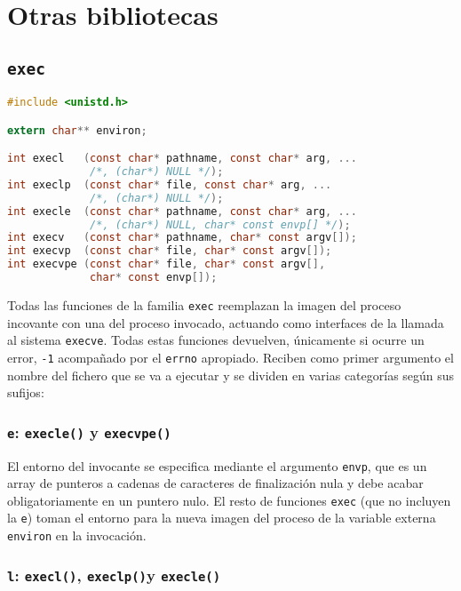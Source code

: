 \chapter{Otras bibliotecas}

\section{\texttt{exec}}\label{exec}

\begin{lstlisting}[language=C]
#include <unistd.h>

extern char** environ;

int execl   (const char* pathname, const char* arg, ...
             /*, (char*) NULL */);
int execlp  (const char* file, const char* arg, ...
             /*, (char*) NULL */);
int execle  (const char* pathname, const char* arg, ...
             /*, (char*) NULL, char* const envp[] */);
int execv   (const char* pathname, char* const argv[]);
int execvp  (const char* file, char* const argv[]);
int execvpe (const char* file, char* const argv[],
             char* const envp[]);
\end{lstlisting}

Todas las funciones de la familia \texttt{exec} reemplazan la imagen del proceso incovante con una del proceso invocado, actuando como interfaces de la llamada al sistema \texttt{execve}.
Todas estas funciones devuelven, únicamente si ocurre un error, \texttt{-1} acompañado por el \texttt{errno} apropiado.
Reciben como primer argumento el nombre del fichero que se va a ejecutar y se dividen en varias categorías según sus sufijos:

\subsection{\texttt{e}: \texttt{execle()} y \texttt{execvpe()}}

El entorno del invocante se especifica mediante el argumento \texttt{envp}, que es un array de punteros a cadenas de caracteres de finalización nula y debe acabar obligatoriamente en un puntero nulo.
El resto de funciones \texttt{exec} (que no incluyen la \texttt{e}) toman el entorno para la nueva imagen del proceso de la variable externa \texttt{environ} en la invocación.

\subsection{\texttt{l}: \texttt{execl()}, \texttt{execlp()}y \texttt{execle()}}

